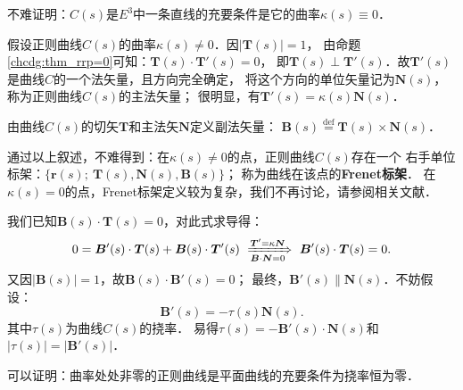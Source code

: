 不难证明：$C(s)$是$E^3$中一条直线的充要条件是它的曲率$\kappa(s)\equiv 0$．


假设正则曲线$C(s)$的曲率$\kappa(s)\neq 0$．因$|\boldsymbol{T}(s)|=1$，
由命题\ref{chcdg:thm_rrp=0}可知：$\boldsymbol{T}(s)\cdot \boldsymbol{T}'(s)=0$，
即$\boldsymbol{T}(s) \perp \boldsymbol{T}'(s)$．故$\boldsymbol{T}'(s)$是曲线$C$的一个法矢量，且方向完全确定，
将这个方向的单位矢量记为$\boldsymbol{N}(s)$，称为正则曲线$C(s)$的{\heiti 主法矢量}；
很明显，有$\boxed{\boldsymbol{T}'(s) = \kappa(s) \boldsymbol{N}(s) }$．

由曲线$C(s)$的切矢$\boldsymbol{T}$和主法矢$\boldsymbol{N}$定义{\heiti 副法矢量}：
$    \boldsymbol{B}(s) \overset{\mathrm {def}}{=} \boldsymbol{T}(s) \times \boldsymbol{N}(s)$．

通过以上叙述，不难得到：在$\kappa(s)\neq 0$的点，正则曲线$C(s)$存在一个
右手单位标架：$\{\boldsymbol{r}(s);\  \boldsymbol{T}(s), \boldsymbol{N}(s), \boldsymbol{B}(s) \}$；
称为曲线在该点的{\bfseries \heiti Frenet标架}．
在$\kappa(s)= 0$的点，Frenet标架定义较为复杂，我们不再讨论，请参阅相关文献．


我们已知$\boldsymbol{B}(s)\cdot \boldsymbol{T}(s) = 0$，对此式求导得：
\begin{align*}
    0= \boldsymbol{B}'(s) \cdot \boldsymbol{T}(s) + \boldsymbol{B}(s) \cdot \boldsymbol{T}'(s)
    \ \xRightarrow [\boldsymbol{B} \cdot \boldsymbol{N}=0]{\boldsymbol{T}' = \kappa \boldsymbol{N}} \ 
    \boldsymbol{B}'(s) \cdot \boldsymbol{T}(s) =0 .
\end{align*}
又因$|\boldsymbol{B}(s)|=1$，故$\boldsymbol{B}(s) \cdot \boldsymbol{B}'(s)=0$；
最终，$\boldsymbol{B}'(s) \parallel \boldsymbol{N}(s)$．不妨假设：
\begin{equation}
    \boldsymbol{B}'(s)=-\tau(s) \boldsymbol{N}(s) .
\end{equation}
其中$\tau(s)$为曲线$C(s)$的{\heiti 挠率}．
易得$\tau(s)= - \boldsymbol{B}'(s) \cdot \boldsymbol{N}(s)$和$|\tau(s)|=|\boldsymbol{B}'(s)|$．

可以证明：曲率处处非零的正则曲线是平面曲线的充要条件为挠率恒为零．


